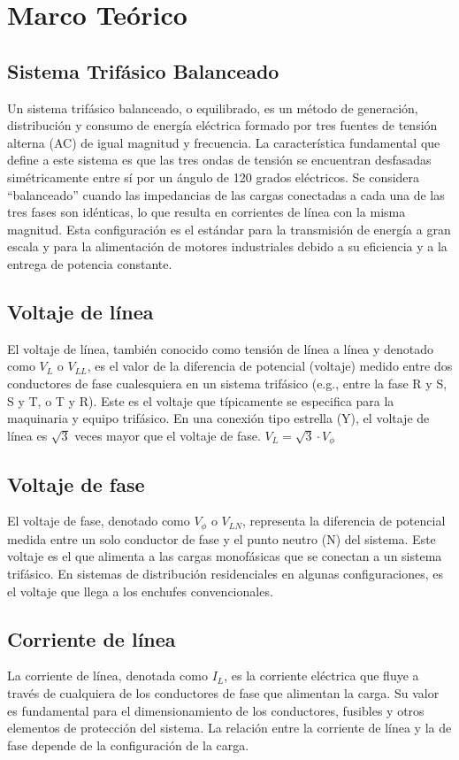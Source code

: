 \documentclass[12pt, letterpaper]{article}
\begin{document}
\section{Marco Teórico}

\subsection{Sistema Trifásico Balanceado}
Un sistema trifásico balanceado, o equilibrado, es un método de generación, distribución y consumo de energía eléctrica formado por tres fuentes de tensión alterna (AC) de igual magnitud y frecuencia. La característica fundamental que define a este sistema es que las tres ondas de tensión se encuentran desfasadas simétricamente entre sí por un ángulo de 120 grados eléctricos. Se considera ``balanceado'' cuando las impedancias de las cargas conectadas a cada una de las tres fases son idénticas, lo que resulta en corrientes de línea con la misma magnitud. Esta configuración es el estándar para la transmisión de energía a gran escala y para la alimentación de motores industriales debido a su eficiencia y a la entrega de potencia constante.

\subsection{Voltaje de línea}
El voltaje de línea, también conocido como tensión de línea a línea y denotado como \(V_L\) o \(V_{LL}\), es el valor de la diferencia de potencial (voltaje) medido entre dos conductores de fase cualesquiera en un sistema trifásico (e.g., entre la fase R y S, S y T, o T y R). Este es el voltaje que típicamente se especifica para la maquinaria y equipo trifásico. En una conexión tipo estrella (Y), el voltaje de línea es \(\sqrt{3}\) veces mayor que el voltaje de fase.
\( V_L = \sqrt{3} \cdot V_{\phi} \)

\subsection{Voltaje de fase}
El voltaje de fase, denotado como \(V_{\phi}\) o \(V_{LN}\), representa la diferencia de potencial medida entre un solo conductor de fase y el punto neutro (N) del sistema. Este voltaje es el que alimenta a las cargas monofásicas que se conectan a un sistema trifásico. En sistemas de distribución residenciales en algunas configuraciones, es el voltaje que llega a los enchufes convencionales.

\subsection{Corriente de línea}
La corriente de línea, denotada como \(I_L\), es la corriente eléctrica que fluye a través de cualquiera de los conductores de fase que alimentan la carga. Su valor es fundamental para el dimensionamiento de los conductores, fusibles y otros elementos de protección del sistema. La relación entre la corriente de línea y la de fase depende de la configuración de la carga.
\end{document}

